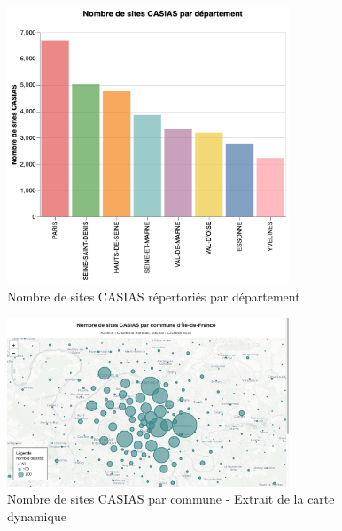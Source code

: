 \documentclass[a4paper,twoside,12pt]{book}
\begin{document}
\begin{figure}[!h]
\centering 
\includegraphics[width=0.75\textwidth]{img/chapitre3/CASIAS_Nb_Sites_par_Dept.png}
\caption{Nombre de sites CASIAS répertoriés par département}
\label{fig:nb_sites_dept_bleu}
\end{figure}

\begin{figure}[!h]
\centering 
\includegraphics[width=0.75\textwidth]{img/chapitre3/Casias_Carte_Nb_Sites_Com}
\caption{Nombre de sites CASIAS par commune - Extrait de la carte dynamique}
\label{fig:nb_sites_com}
\end{figure}
\end{document}
